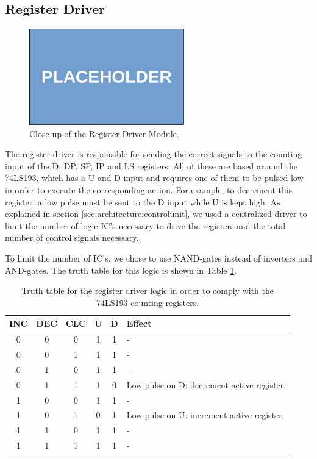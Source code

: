 
\subsection{Register Driver} \label{sec:implementation:registerdriver}
\begin{figure}[H]
  \centering
  \includegraphics[width=0.6\textwidth]{img/placeholder}
  \caption{Close up of the Register Driver Module.}
  \label{fig:registerdrivercloseup}
\end{figure}
The register driver is responsible for sending the correct signals to the counting input of the D, DP, SP, IP and LS registers. All of these are based around the 74LS193, which has a U and D input and requires one of them to be pulsed low in order to execute the corresponding action. For example, to decrement this register, a low pulse must be sent to the D input while U is kept high. As explained in section \ref{sec:architecture:controlunit}, we used a centralized driver to limit the number of logic IC's necessary to drive the registers and the total number of control signals necessary.

To limit the number of IC's, we chose to use NAND-gates instead of inverters and AND-gates. The truth table for this logic is shown in Table \ref{tab:registerdrivertruth}.

\begin{table}[h]
  \centering
  \begin{tabular}{ccc|cc|l}
    INC & DEC & CLC & U & D & Effect \\ \hline
    0   & 0   & 0   & 1 & 1 & - \\
    0   & 0   & 1   & 1 & 1 & - \\
    0   & 1   & 0   & 1 & 1 & - \\
    0   & 1   & 1   & 1 & 0 & Low pulse on D: decrement active register. \\
    1   & 0   & 0   & 1 & 1 & - \\
    1   & 0   & 1   & 0 & 1 & Low pulse on U: increment active register \\
    1   & 1   & 0   & 1 & 1 & - \\
    1   & 1   & 1   & 1 & 1 & - \\
  \end{tabular}
  \caption{Truth table for the register driver logic in order to comply with the 74LS193 counting registers.}
  \label{tab:registerdrivertruth}
\end{table}

